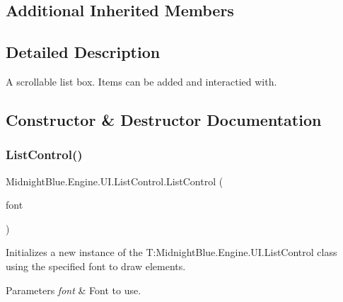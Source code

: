 \subsection*{Additional Inherited Members}


\subsection{Detailed Description}
A scrollable list box. Items can be added and interactied with. 



\subsection{Constructor \& Destructor Documentation}
\hypertarget{class_midnight_blue_1_1_engine_1_1_u_i_1_1_list_control_ac75da180d7693f41f97e88e9f37bf1bd}{}\label{class_midnight_blue_1_1_engine_1_1_u_i_1_1_list_control_ac75da180d7693f41f97e88e9f37bf1bd} 
\subsubsection{\texorpdfstring{List\+Control()}{ListControl()}\hspace{0.1cm}{\footnotesize\ttfamily [1/2]}}
{\footnotesize\ttfamily Midnight\+Blue.\+Engine.\+U\+I.\+List\+Control.\+List\+Control (\begin{DoxyParamCaption}\item[{Sprite\+Font}]{font }\end{DoxyParamCaption})\hspace{0.3cm}{\ttfamily [inline]}}



Initializes a new instance of the T\+:\+Midnight\+Blue.\+Engine.\+U\+I.\+List\+Control class using the specified font to draw elements. 


\begin{DoxyParams}{Parameters}
{\em font} & Font to use.\\
\hline
\end{DoxyParams}
\hypertarget{class_midnight_blue_1_1_engine_1_1_u_i_1_1_list_control_a361177221501c8fc694a0f31e9236377}{}\label{class_midnight_blue_1_1_engine_1_1_u_i_1_1_list_control_a361177221501c8fc694a0f31e9236377} 
